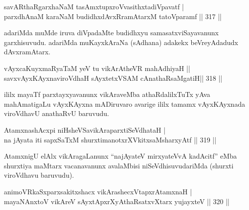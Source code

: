 \begin{shl}
savARthaRgarxhaNaM tasAmxtupxroVvasithxtadiVpavatf | \\
parxdhAnaM karaNaM budidhxdAvxRramAtarxM tatoV\s paramf \hfill||  317 || 
\end{shl}

\begin{artha}
adariMda muMde iruva diVpadaMte budidhxyu samasatxviSayavanunx garxhisuvudu. adariMda muKayxkAraNa (sAdhana) adakekx beVreyAdadudx dAvxramAtarx.
\end{artha}


\begin{shl}
vAyxcaKuyxmaRyaTaM yeV tu vikArAtheVR mahAdhiyaH ||  \\
\footnotemark[1]{}savxvAyxKAyxnaviroVdhaH sAyxtetxVSAM cAnathaRsaMgatiH\hfill ||  318 ||  
\end{shl}

\begin{artha}
ililx mayaTf parxtayxyavanunx vikAraveMba athaRdalilxTuTx yAva mahAmati\-gaLu vAyxKAyxna mADiruvaro avarige ililx tamamx vAyxKAyxnada viroVdhavU anathaRvU baruvudu.
\end{artha}

\begin{shl}
AtamxnashAcxpi niHsheVSavikAraparxtiSeVdhataH | \\
na jAyata iti sapxSaTxM shurxtimanotxrXVkitxsaMsharxyAtf \hfill||  319 ||  
\end{shl}

\begin{artha}
AtamxnigU elAlx vikAragaLanunx ``najAyateV mirxyateVvA kadAcitf'' eMba shurxtiya maMtarx vacanavanunx avalaMbisi niSeVdhisuvudariMda (shurxti viroVdhavu baruvudu).
\end{artha}

\begin{shl}
animoVRkaSxparxsakitxshacx vikArashecxVtapxrAtamxnaH | \\
mayaNAnxtoV vikAreV sAyxtApxrXyAthaRsatxvXtarx yujayxteV \hfill||  320 ||  
\end{shl}

